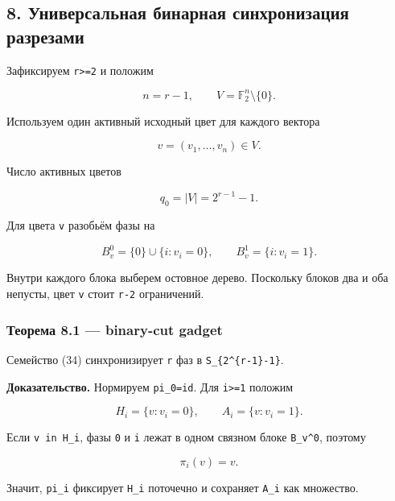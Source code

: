 \hypertarget{ux443ux43dux438ux432ux435ux440ux441ux430ux43bux44cux43dux430ux44f-ux431ux438ux43dux430ux440ux43dux430ux44f-ux441ux438ux43dux445ux440ux43eux43dux438ux437ux430ux446ux438ux44f-ux440ux430ux437ux440ux435ux437ux430ux43cux438}{%
\subsection{8. Универсальная бинарная синхронизация
разрезами}\label{ux443ux43dux438ux432ux435ux440ux441ux430ux43bux44cux43dux430ux44f-ux431ux438ux43dux430ux440ux43dux430ux44f-ux441ux438ux43dux445ux440ux43eux43dux438ux437ux430ux446ux438ux44f-ux440ux430ux437ux440ux435ux437ux430ux43cux438}}

Зафиксируем \texttt{r\textgreater{}=2} и положим

\[
n=r-1,
\qquad
V=\mathbb F_2^n\setminus\{0\}.
\tag{32}
\]

Используем один активный исходный цвет для каждого вектора

\[
v=(v_1,\ldots,v_n)\in V.
\]

Число активных цветов

\[
q_0=|V|=2^{r-1}-1.
\tag{33}
\]

Для цвета \texttt{v} разобьём фазы на

\[
B_v^0=\{0\}\cup\{i:v_i=0\},
\qquad
B_v^1=\{i:v_i=1\}.
\tag{34}
\]

Внутри каждого блока выберем остовное дерево. Поскольку блоков два и оба
непусты, цвет \texttt{v} стоит \texttt{r-2} ограничений.

\hypertarget{ux442ux435ux43eux440ux435ux43cux430-8.1-binary-cut-gadget}{%
\subsubsection{Теорема 8.1 --- binary-cut
gadget}\label{ux442ux435ux43eux440ux435ux43cux430-8.1-binary-cut-gadget}}

Семейство (34) синхронизирует \texttt{r} фаз в
\texttt{S\_\{2\^{}\{r-1\}-1\}}.

\textbf{Доказательство.} Нормируем \texttt{pi\_0=id}. Для
\texttt{i\textgreater{}=1} положим

\[
H_i=\{v:v_i=0\},
\qquad
A_i=\{v:v_i=1\}.
\tag{35}
\]

Если \texttt{v\ in\ H\_i}, фазы \texttt{0} и \texttt{i} лежат в одном
связном блоке \texttt{B\_v\^{}0}, поэтому

\[
\pi_i(v)=v.
\tag{36}
\]

Значит, \texttt{pi\_i} фиксирует \texttt{H\_i} поточечно и сохраняет
\texttt{A\_i} как множество.

